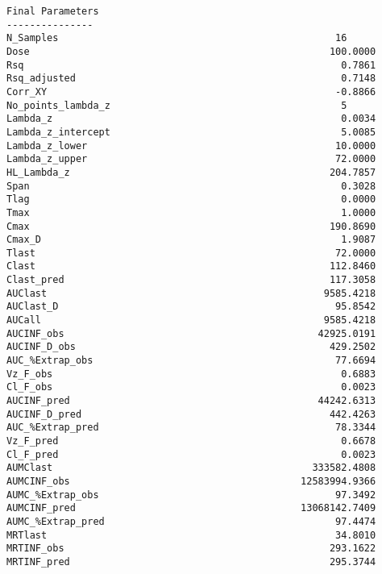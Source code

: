 \documentclass[12pt,a4paper]{article}
\begin{document}
\begin{verbatim}
Final Parameters
---------------
N_Samples                                                16
Dose                                                    100.0000
Rsq                                                       0.7861
Rsq_adjusted                                              0.7148
Corr_XY                                                  -0.8866
No_points_lambda_z                                        5
Lambda_z                                                  0.0034
Lambda_z_intercept                                        5.0085
Lambda_z_lower                                           10.0000
Lambda_z_upper                                           72.0000
HL_Lambda_z                                             204.7857
Span                                                      0.3028
Tlag                                                      0.0000
Tmax                                                      1.0000
Cmax                                                    190.8690
Cmax_D                                                    1.9087
Tlast                                                    72.0000
Clast                                                   112.8460
Clast_pred                                              117.3058
AUClast                                                9585.4218
AUClast_D                                                95.8542
AUCall                                                 9585.4218
AUCINF_obs                                            42925.0191
AUCINF_D_obs                                            429.2502
AUC_%Extrap_obs                                          77.6694
Vz_F_obs                                                  0.6883
Cl_F_obs                                                  0.0023
AUCINF_pred                                           44242.6313
AUCINF_D_pred                                           442.4263
AUC_%Extrap_pred                                         78.3344
Vz_F_pred                                                 0.6678
Cl_F_pred                                                 0.0023
AUMClast                                             333582.4808
AUMCINF_obs                                        12583994.9366
AUMC_%Extrap_obs                                         97.3492
AUMCINF_pred                                       13068142.7409
AUMC_%Extrap_pred                                        97.4474
MRTlast                                                  34.8010
MRTINF_obs                                              293.1622
MRTINF_pred                                             295.3744




\end{verbatim}
\end{document}
